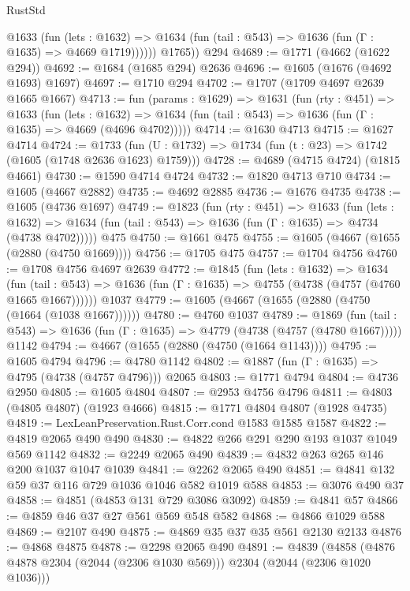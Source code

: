 \begin{lexlean}{RustStd}
\begin{coremodule}
{\begin{coremodule}
{{{{{{{{{{{{{{            @1633
              (fun (lets : @1632) =>
              @1634 (fun (tail : @543) => @1636 (fun (Γ : @1635) => @4669 @1719))))))
        @1765))
    @294
@4689 := @1771 (@4662 (@1622 @294))
@4692 := @1684 (@1685 @294) @2636
@4696 := @1605 (@1676 (@4692 @1693) @1697)
@4697 := @1710 @294
@4702 := @1707 (@1709 @4697 @2639 @1665 @1667)
@4713 := fun (params : @1629) =>
  @1631
    (fun (rty : @451) =>
    @1633
      (fun (lets : @1632) =>
      @1634 (fun (tail : @543) => @1636 (fun (Γ : @1635) => @4669 (@4696 @4702)))))
@4714 := @1630 @4713
@4715 := @1627 @4714
@4724 := @1733 (fun (U : @1732) => @1734 (fun (t : @23) => @1742 (@1605 (@1748 @2636 @1623) @1759)))
@4728 := @4689 (@4715 @4724) (@1815 @4661)
@4730 := @1590 @4714 @4724
@4732 := @1820 @4713 @710
@4734 := @1605 (@4667 @2882)
@4735 := @4692 @2885
@4736 := @1676 @4735
@4738 := @1605 (@4736 @1697)
@4749 := @1823
    (fun (rty : @451) =>
    @1633
      (fun (lets : @1632) =>
      @1634 (fun (tail : @543) => @1636 (fun (Γ : @1635) => @4734 (@4738 @4702)))))
    @475
@4750 := @1661 @475
@4755 := @1605 (@4667 (@1655 (@2880 (@4750 @1669))))
@4756 := @1705 @475
@4757 := @1704 @4756
@4760 := @1708 @4756 @4697 @2639
@4772 := @1845
    (fun (lets : @1632) =>
    @1634
      (fun (tail : @543) => @1636 (fun (Γ : @1635) => @4755 (@4738 (@4757 (@4760 @1665 @1667))))))
    @1037
@4779 := @1605 (@4667 (@1655 (@2880 (@4750 (@1664 (@1038 @1667))))))
@4780 := @4760 @1037
@4789 := @1869
    (fun (tail : @543) => @1636 (fun (Γ : @1635) => @4779 (@4738 (@4757 (@4780 @1667)))))
    @1142
@4794 := @4667 (@1655 (@2880 (@4750 (@1664 @1143))))
@4795 := @1605 @4794
@4796 := @4780 @1142
@4802 := @1887 (fun (Γ : @1635) => @4795 (@4738 (@4757 @4796))) @2065
@4803 := @1771 @4794
@4804 := @4736 @2950
@4805 := @1605 @4804
@4807 := @2953 @4756 @4796
@4811 := @4803 (@4805 @4807) (@1923 @4666)
@4815 := @1771 @4804 @4807 (@1928 @4735)
@4819 := LexLeanPreservation.Rust.Corr.cond @1583 @1585 @1587
@4822 := @4819 @2065 @490 @490
@4830 := @4822 @266 @291 @290 @193 @1037 @1049 @569 @1142
@4832 := @2249 @2065 @490
@4839 := @4832 @263 @265 @146 @200 @1037 @1047 @1039
@4841 := @2262 @2065 @490
@4851 := @4841 @132 @59 @37 @116 @729 @1036 @1046 @582 @1019 @588
@4853 := @3076 @490 @37
@4858 := @4851 (@4853 @131 @729 @3086 @3092)
@4859 := @4841 @57
@4866 := @4859 @46 @37 @27 @561 @569 @548 @582
@4868 := @4866 @1029 @588
@4869 := @2107 @490
@4875 := @4869 @35 @37 @35 @561 @2130 @2133
@4876 := @4868 @4875
@4878 := @2298 @2065 @490
@4891 := @4839
    (@4858 (@4876 @4878 @2304 (@2044 (@2306 @1030 @569))) @2304 (@2044 (@2306 @1020 @1036)))
}}}}}}}}}}}}}}
\end{coremodule}}
\end{coremodule}
\end{lexlean}
